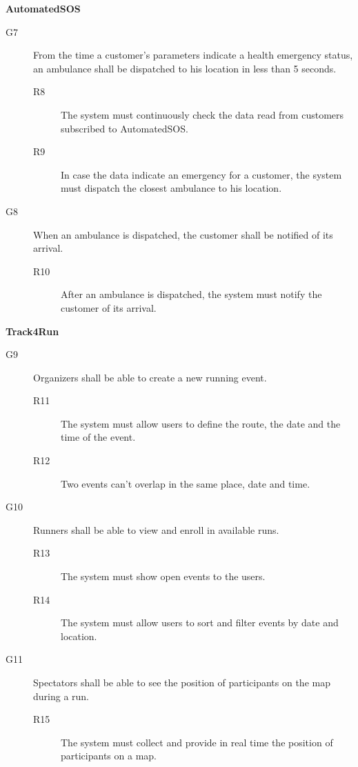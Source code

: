 \documentclass[../main.tex]{subfiles}
\begin{document}
\begin{minipage}{\textwidth}
{\bf AutomatedSOS}
\begin{description}
	\item [G7]  From the time a customer's parameters indicate a health emergency status, an ambulance shall be dispatched to his location in less than 5 seconds.
	\begin{description}
		\item [R8] The system must continuously check the data read from customers subscribed to AutomatedSOS.
		\item [R9] In case the data indicate an emergency for a customer, the system must dispatch the closest ambulance to his location.
	\end{description}

	\item [G8]  When an ambulance is dispatched, the customer shall be notified of its arrival.
	\begin{description}
		\item [R10] After an ambulance is dispatched, the system must notify the customer of its arrival.
	\end{description}
\end{description}
\end{minipage}
\vspace{8mm}


\begin{minipage}{\textwidth}
{\bf Track4Run}
\begin{description}
	\item [G9]  Organizers shall be able to create a new running event.
	\begin{description}
		\item [R11] The system must allow users to define the route, the date and the time of the event.
		\item [R12] Two events can't overlap in the same place, date and time.
	\end{description}

	\item [G10]  Runners shall be able to view and enroll in available runs.
	\begin{description}
		\item [R13] The system must show open events to the users.
		\item [R14] The system must allow users to sort and filter events by date and location.
	\end{description}

	\item [G11] Spectators shall be able to see the position of participants on the map during a run.
	\begin{description}
		\item [R15] The system must collect and provide in real time the position of participants on a map.
	\end{description}
\end{description}
\end{minipage}
\vspace{8mm}
\end{document}
